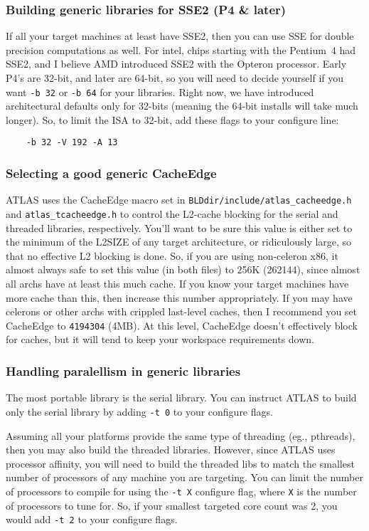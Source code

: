\documentclass[11pt]{article}
\begin{document}
\subsubsection{Building generic libraries for SSE2 (P4 \& later)}
If all your target machines at least have SSE2, then you can use SSE for
double precision computations as well.  For intel, chips starting with
the Pentium~4 had SSE2, and I believe AMD introduced SSE2 with the Opteron
processor.  Early P4's are 32-bit, and later are 64-bit, so you will need
to decide yourself if you want \verb+-b 32+ or \verb+-b 64+ for your 
libraries.  Right now, we have introduced architectural defaults only
for 32-bits (meaning the 64-bit installs will take much longer).  So, to
limit the ISA to 32-bit, add these flags to your configure line:
\begin{verbatim}
    -b 32 -V 192 -A 13
\end{verbatim}

\subsubsection{Selecting a good generic CacheEdge}
ATLAS uses the CacheEdge macro set in 
\verb+BLDdir/include/atlas_cacheedge.h+ and \verb+atlas_tcacheedge.h+ to
control the L2-cache blocking  for the serial and threaded libraries,
respectively.  You'll want to be sure this value is either set to
the minimum of the L2SIZE of any target architecture, or ridiculously large,
so that no effective L2 blocking is done.  So, if you are using non-celeron
x86, it almost always safe to set this value (in both files) to 256K
(262144), since almost all archs have at least this much cache.  If you
know your target machines have more cache than this, then increase this
number appropriately.  If you may have celerons or other archs with
crippled last-level caches, then I recommend you set CacheEdge to
\verb+4194304+ (4MB).  At this level, CacheEdge doesn't effectively
block for caches, but it will tend to keep your workspace requirements
down.

\subsubsection{Handling paralellism in generic libraries}
The most portable library is the serial library.  You can instruct ATLAS
to build only the serial library by adding \verb+-t 0+ to your configure
flags.

Assuming all your platforms provide the same type of threading (eg., pthreads),
then you may also build the threaded libraries.  However, since ATLAS uses
processor affinity, you will need to build the threaded libs to match the
smallest number of processors of any machine you are targeting.  You can
limit the number of processors to compile for using the \verb+-t X+
configure flag, where \verb+X+ is the number of processors to tune for.
So, if your smallest targeted core count was 2, you would add \verb+-t 2+
to your configure flags.
\end{document}
